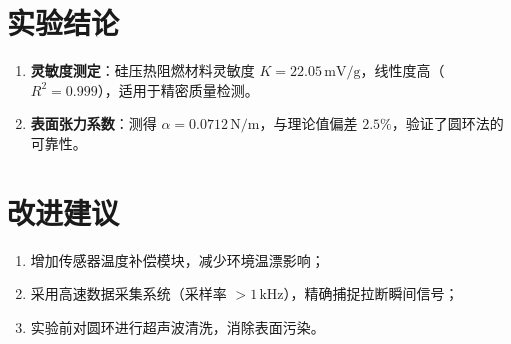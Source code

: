 \documentclass[12pt,a4paper]{article}
\begin{document}
\section{实验结论}
\begin{enumerate}
\item \textbf{灵敏度测定}：硅压热阻燃材料灵敏度 $K = 22.05 \, \text{mV/g}$，线性度高（$R^2 = 0.999$），适用于精密质量检测。
\item \textbf{表面张力系数}：测得 $\alpha = 0.0712 \, \text{N/m}$，与理论值偏差 $2.5\%$，验证了圆环法的可靠性。
\end{enumerate}

\section{改进建议}
\begin{enumerate}
\item 增加传感器温度补偿模块，减少环境温漂影响；
\item 采用高速数据采集系统（采样率 $> 1 \, \text{kHz}$），精确捕捉拉断瞬间信号；
\item 实验前对圆环进行超声波清洗，消除表面污染。
\end{enumerate}
\end{document}
